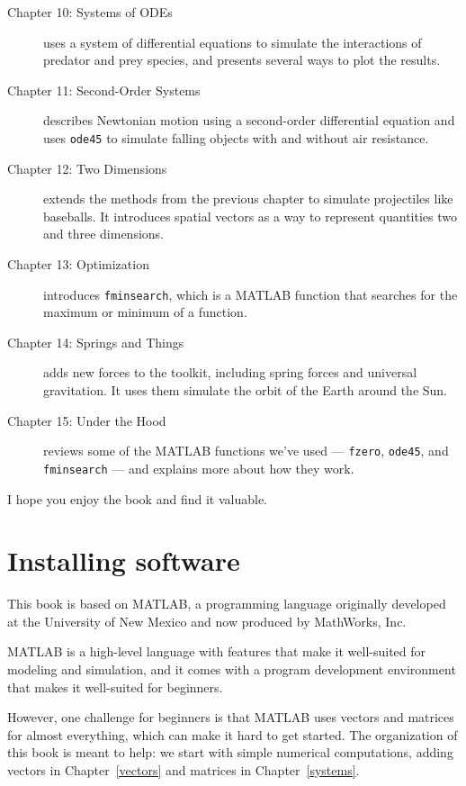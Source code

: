 \begin{description}
\item [Chapter 10: Systems of ODEs] uses a system of differential equations to simulate the interactions of predator and prey species, and presents several ways to plot the results.

\item [Chapter 11: Second-Order Systems] describes Newtonian motion using a second-order differential equation and uses {\tt ode45} to simulate falling objects with and without air resistance.

\item [Chapter 12: Two Dimensions] extends the methods from the previous chapter to simulate projectiles like baseballs.  It introduces spatial vectors as a way to represent quantities two and three dimensions.

\item [Chapter 13: Optimization] introduces {\tt fminsearch}, which is a MATLAB function that searches for the maximum or minimum of a function.

\item [Chapter 14: Springs and Things] adds new forces to the toolkit, including spring forces and universal gravitation.  It uses them simulate the orbit of the Earth around the Sun.

\item [Chapter 15: Under the Hood] reviews some of the MATLAB functions we've used --- {\tt fzero}, {\tt ode45}, and {\tt fminsearch} --- and explains more about how they work.

\end{description}

I hope you enjoy the book and find it valuable.


\section*{Installing software}

This book is based on MATLAB, a programming language originally developed at the University of New Mexico and now produced by MathWorks, Inc.

MATLAB is a high-level language with features that make it well-suited for modeling and simulation, and it comes with a program development environment that makes it well-suited for beginners.

However, one challenge for beginners is that MATLAB uses vectors and matrices for almost everything, which can make it hard to get started.  The organization of this book is meant to help: we start with simple numerical computations, adding vectors in Chapter~\ref{vectors} and matrices in Chapter~\ref{systems}.

